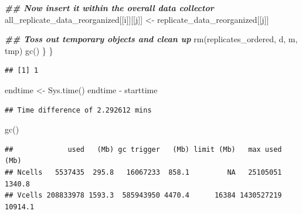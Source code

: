 \documentclass[
]{book}
\newenvironment{Shaded}{\begin{snugshade}}{\end{snugshade}}
\newcommand{\CommentTok}[1]{\textcolor[rgb]{0.56,0.35,0.01}{\textit{#1}}}
\newcommand{\ControlFlowTok}[1]{\textcolor[rgb]{0.13,0.29,0.53}{\textbf{#1}}}
\newcommand{\DecValTok}[1]{\textcolor[rgb]{0.00,0.00,0.81}{#1}}
\newcommand{\DocumentationTok}[1]{\textcolor[rgb]{0.56,0.35,0.01}{\textbf{\textit{#1}}}}
\newcommand{\FunctionTok}[1]{\textcolor[rgb]{0.00,0.00,0.00}{#1}}
\newcommand{\NormalTok}[1]{#1}
\newcommand{\OtherTok}[1]{\textcolor[rgb]{0.56,0.35,0.01}{#1}}
\newcommand{\SpecialCharTok}[1]{\textcolor[rgb]{0.00,0.00,0.00}{#1}}
\begin{document}
\begin{Shaded}
\begin{Highlighting}[]
    \DocumentationTok{\#\# Now insert it within the overall data collector}
\NormalTok{    all\_replicate\_data\_reorganized[[i]][[j]] }\OtherTok{\textless{}{-}}
\NormalTok{      replicate\_data\_reorganized[[j]]}

    \DocumentationTok{\#\# Toss out temporary objects and clean up}
    \FunctionTok{rm}\NormalTok{(replicates\_ordered, d, m, tmp)}
    \FunctionTok{gc}\NormalTok{()}
\NormalTok{  \}}
\NormalTok{\}}
\end{Highlighting}
\end{Shaded}

\begin{verbatim}
## [1] 1
\end{verbatim}

\begin{Shaded}
\begin{Highlighting}[]
\NormalTok{endtime }\OtherTok{\textless{}{-}} \FunctionTok{Sys.time}\NormalTok{()}
\NormalTok{endtime }\SpecialCharTok{{-}}\NormalTok{ starttime}
\end{Highlighting}
\end{Shaded}

\begin{verbatim}
## Time difference of 2.292612 mins
\end{verbatim}

\begin{Shaded}
\begin{Highlighting}[]
\FunctionTok{gc}\NormalTok{()}
\end{Highlighting}
\end{Shaded}

\begin{verbatim}
##             used   (Mb) gc trigger   (Mb) limit (Mb)   max used    (Mb)
## Ncells   5537435  295.8   16067233  858.1         NA   25105051  1340.8
## Vcells 208833978 1593.3  585943950 4470.4      16384 1430527219 10914.1
\end{verbatim}

\begin{Shaded}
\end{Shaded}
\end{document}

